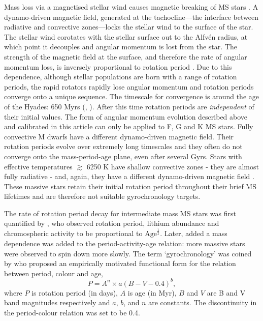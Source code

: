 \documentclass[12pt,preprint]{aastex}
\begin{document}
Mass loss via a magnetised stellar wind causes magnetic breaking of MS stars \citep{Weber1967}.
A dynamo-driven magnetic field, generated at the tachocline---the interface between radiative and convective zones---locks the stellar wind to the surface of the star.
The stellar wind corotates with the stellar surface out to the Alfv\'{e}n radius, at which point it decouples and angular momentum is lost from the star.
The strength of the magnetic field at the surface, and therefore the rate of angular momentum loss, is inversely proportional to rotation period \citep{Kawaler1988}.
Due to this dependence, although stellar populations are born with a range of rotation periods, the rapid rotators rapidly lose angular momentum and rotation periods converge onto a unique sequence.
The timescale for convergence is around the age of the Hyades: 650 Myrs (\citealt{Radick1987}, \citealt{Irwin2009}).
After this time rotation periods are \emph{independent} of their initial values.
The form of angular momentum evolution described above and calibrated in this article can only be applied to F, G and K MS stars.
Fully convective M dwarfs have a different dynamo-driven magnetic field.
Their rotation periods evolve over extremely long timescales and they often do not converge onto the mass-period-age plane, even after several Gyrs.
Stars with effective temperatures $\gtrsim$ 6250 K have shallow convective zones - they are almost fully radiative - and, again, they have a different dynamo-driven magnetic field \citep{Kraft1967}.
These massive stars retain their initial rotation period throughout their brief MS lifetimes and are therefore not suitable gyrochronology targets.

The rate of rotation period decay for intermediate mass MS stars was first quantified by \citet{Skumanich1972}, who observed rotation period, lithium abundance and chromospheric activity to be proportional to $\mathrm{Age}^{\frac{1}{2}}$.
Later, \citet{Noyes1984_2} added a mass dependence was added to the period-activity-age relation: more massive stars were observed to spin down more slowly.
The term `gyrochronology' was coined by \citet{Barnes2003} who proposed an empirically motivated functional form for the relation between period, colour and age,
\begin{equation}
P = A^n \times a(B-V-0.4)^b,
\label{eq:Barnes2007_2}
\end{equation}
where $P$ is rotation period (in days), $A$ is age (in Myr), $B$ and $V$ are B and V band magnitudes respectively and $a$, $b$, and $n$ are constants.
The discontinuity in the period-colour relation was set to be 0.4.
\end{document}
